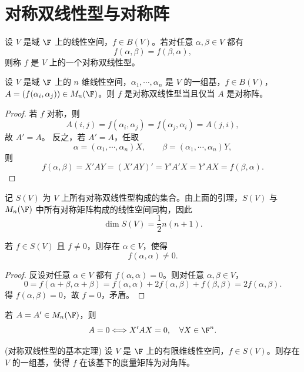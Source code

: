 \section{对称双线性型与对称阵}
\begin{definition}[对称双线性型]
	设 $V$ 是域 $\F$ 上的线性空间，$f\in B(V)$。若对任意 $\alpha,\beta\in V$ 都有
	\[
	f(\alpha,\beta)=f(\beta,\alpha),
	\]
	则称 $f$ 是 $V$ 上的一个对称双线性型。
\end{definition}

\begin{lemma}
	设 $V$ 是域 $\F$ 上的 $n$ 维线性空间，$\alpha_1,\cdots,\alpha_n$ 是 $V$ 的一组基，$f\in B(V)$，$A=(f(\alpha_i,\alpha_j))\in M_n(\F)$。则 $f$ 是对称双线性型当且仅当 $A$ 是对称阵。
\end{lemma}

\begin{proof}
	若 $f$ 对称，则
	\[
	A(i,j)=f(\alpha_i,\alpha_j)=f(\alpha_j,\alpha_i)=A(j,i),
	\]
	故 $A'=A$。
	反之，若 $A'=A$，任取
	\[
	\alpha=(\alpha_1,\cdots,\alpha_n)X,
	\qquad
	\beta=(\alpha_1,\cdots,\alpha_n)Y,
	\]
	则
	\[
	f(\alpha,\beta)=X'AY=(X'AY)'=Y'A'X=Y'AX=f(\beta,\alpha).
	\]
\end{proof}

记 $S(V)$ 为 $V$ 上所有对称双线性型构成的集合。由上面的引理，$S(V)$ 与 $M_n(\F)$ 中所有对称矩阵构成的线性空间同构，因此
\[
\dim S(V)=\frac{1}{2}n(n+1).
\]

\begin{lemma}
	若 $f\in S(V)$ 且 $f\ne 0$，则存在 $\alpha\in V$，使得
	\[
	f(\alpha,\alpha)\ne 0.
	\]
\end{lemma}

\begin{proof}
	反设对任意 $\alpha\in V$ 都有 $f(\alpha,\alpha)=0$。则对任意 $\alpha,\beta\in V$，
	\[
	0=f(\alpha+\beta,\alpha+\beta)
	=f(\alpha,\alpha)+2f(\alpha,\beta)+f(\beta,\beta)
	=2f(\alpha,\beta).
	\]
	得 $f(\alpha,\beta)=0$，故 $f=0$，矛盾。
\end{proof}

\begin{corollary}
	若 $A=A'\in M_n(\F)$，则
	\[
	A=0
	\Longleftrightarrow
	X'AX=0,\quad \forall X\in\F^n.
	\]
\end{corollary}

\begin{theorem}(对称双线性型的基本定理)
	设 $V$ 是 $\F$ 上的有限维线性空间，$f\in S(V)$。则存在 $V$ 的一组基，使得 $f$ 在该基下的度量矩阵为对角阵。
\end{theorem}

